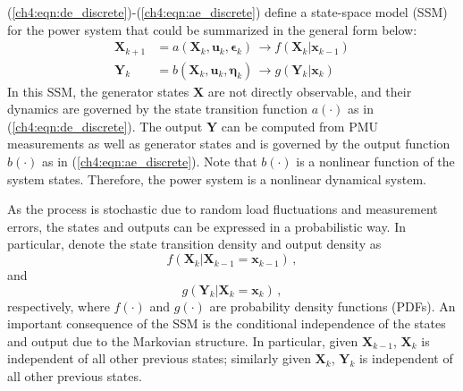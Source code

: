 (\ref{ch4:eqn:de_discrete})-(\ref{ch4:eqn:ae_discrete}) define a state-space model (SSM) for the power system that could be summarized in the general form below:
\begin{subequations}
\label{ch4:eqn:general_ssm}
\begin{align}
\boldsymbol{X}_{k+1} &= a(\boldsymbol{X}_{k}, \boldsymbol{u}_{k}, \boldsymbol{\epsilon}_{k}) \, \rightarrow f(\boldsymbol{X}_{k}|\boldsymbol{x}_{k-1}) \\ 
\boldsymbol{Y}_{k} &= b(\boldsymbol{X}_{k}, \boldsymbol{u}_{k}, \boldsymbol{\eta}_{k}) \, \rightarrow g(\boldsymbol{Y}_{k} | \boldsymbol{x}_{k})
\end{align}
\end{subequations}
In this SSM, the generator states $\boldsymbol{X}$ are not directly observable, and their dynamics are governed by the state transition function $a(\cdot)$ as in (\ref{ch4:eqn:de_discrete}). The output $\boldsymbol{Y}$ can be computed from PMU measurements as well as generator states and is governed by the output function $b(\cdot)$ as in (\ref{ch4:eqn:ae_discrete}). Note that $b(\cdot)$ is a nonlinear function of the system states. Therefore, the power system is a nonlinear dynamical system. 

As the process is stochastic due to random load fluctuations and measurement errors, the states and outputs can be expressed in a probabilistic way. In particular, denote the state transition density and output density as 
$$
f(\boldsymbol{X}_{k}|\boldsymbol{X}_{k-1}=\boldsymbol{x}_{k-1}) \,,
$$ 
and 
$$
g(\boldsymbol{Y}_{k} |\boldsymbol{X}_{k}=\boldsymbol{x}_{k}) \,,
$$
respectively, where $f(\cdot)$ and $g(\cdot)$ are probability density functions (PDFs). An important consequence of the SSM is the conditional independence of the states and output due to the Markovian structure. In particular, given $\boldsymbol{X}_{k-1}$, $\boldsymbol{X}_k$ is independent of all other previous states; similarly given $\boldsymbol{X}_{k}$, $\boldsymbol{Y}_{k}$ is independent of all other previous states.


